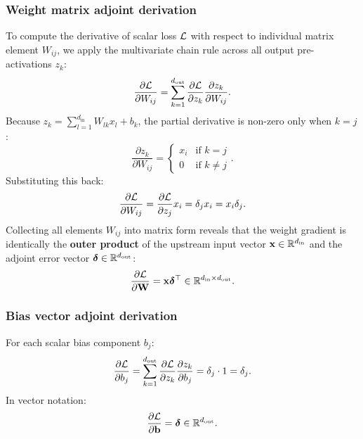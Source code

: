 \documentclass[../../main.tex]{subfiles}
\begin{document}
\subsubsection{Weight matrix adjoint derivation}
To compute the derivative of scalar loss $\mathcal{L}$ with respect to individual matrix element $W_{ij}$, we apply the multivariate chain rule across all output pre-activations $z_k$:
\begin{equation}
\frac{\partial \mathcal{L}}{\partial W_{ij}} = \sum_{k=1}^{d_{\text{out}}} \frac{\partial \mathcal{L}}{\partial z_k} \frac{\partial z_k}{\partial W_{ij}}.
\end{equation}
Because $z_k = \sum_{l=1}^{d_{\text{in}}} W_{lk} x_l + b_k$, the partial derivative is non-zero only when $k = j$:
\begin{equation}
\frac{\partial z_k}{\partial W_{ij}} = \begin{cases} x_i & \text{if } k = j \\ 0 & \text{if } k \ne j \end{cases}.
\end{equation}
Substituting this back:
\begin{equation}
\frac{\partial \mathcal{L}}{\partial W_{ij}} = \frac{\partial \mathcal{L}}{\partial z_j} x_i = \delta_j x_i = x_i \delta_j.
\end{equation}
Collecting all elements $W_{ij}$ into matrix form reveals that the weight gradient is identically the \textbf{outer product} of the upstream input vector $\mathbf{x} \in \mathbb{R}^{d_{\text{in}}}$ and the adjoint error vector $\bm{\delta} \in \mathbb{R}^{d_{\text{out}}}$:
\begin{equation}
\label{eq:weight_matrix_gradient}
\frac{\partial \mathcal{L}}{\partial \mathbf{W}} = \mathbf{x} \bm{\delta}^\top \in \mathbb{R}^{d_{\text{in}} \times d_{\text{out}}}.
\end{equation}

\subsubsection{Bias vector adjoint derivation}
For each scalar bias component $b_j$:
\begin{equation}
\frac{\partial \mathcal{L}}{\partial b_j} = \sum_{k=1}^{d_{\text{out}}} \frac{\partial \mathcal{L}}{\partial z_k} \frac{\partial z_k}{\partial b_j} = \delta_j \cdot 1 = \delta_j.
\end{equation}
In vector notation:
\begin{equation}
\label{eq:bias_vector_gradient}
\frac{\partial \mathcal{L}}{\partial \mathbf{b}} = \bm{\delta} \in \mathbb{R}^{d_{\text{out}}}.
\end{equation}
\end{document}
